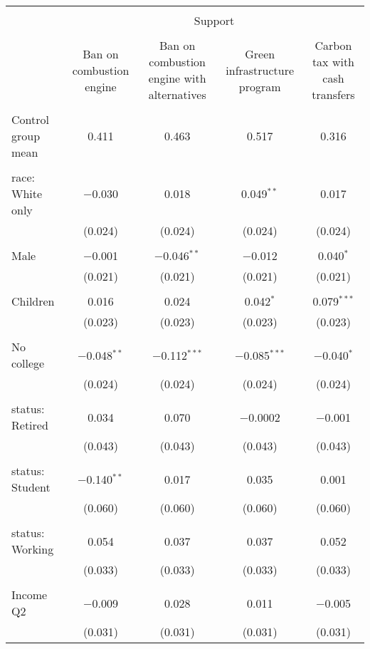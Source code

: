 
\begin{tabular}{@{\extracolsep{5pt}}lcccc} 
\\[-1.8ex]\hline 
\hline \\[-1.8ex] 
 & \multicolumn{4}{c}{Support} \\ 
\cline{2-5} 
\\[-1.8ex] & Ban on combustion engine & Ban on combustion engine with alternatives & Green infrastructure program & Carbon tax with cash transfers \\ 
\hline \\[-1.8ex] 
 Control group mean & 0.411 & 0.463 & 0.517 & 0.316  \\ \hline \\[-1.8ex] race: White only & $-$0.030 & 0.018 & 0.049$^{**}$ & 0.017 \\ 
  & (0.024) & (0.024) & (0.024) & (0.024) \\ 
  & & & & \\ 
 Male & $-$0.001 & $-$0.046$^{**}$ & $-$0.012 & 0.040$^{*}$ \\ 
  & (0.021) & (0.021) & (0.021) & (0.021) \\ 
  & & & & \\ 
 Children & 0.016 & 0.024 & 0.042$^{*}$ & 0.079$^{***}$ \\ 
  & (0.023) & (0.023) & (0.023) & (0.023) \\ 
  & & & & \\ 
 No college & $-$0.048$^{**}$ & $-$0.112$^{***}$ & $-$0.085$^{***}$ & $-$0.040$^{*}$ \\ 
  & (0.024) & (0.024) & (0.024) & (0.024) \\ 
  & & & & \\ 
 status: Retired & 0.034 & 0.070 & $-$0.0002 & $-$0.001 \\ 
  & (0.043) & (0.043) & (0.043) & (0.043) \\ 
  & & & & \\ 
 status: Student & $-$0.140$^{**}$ & 0.017 & 0.035 & 0.001 \\ 
  & (0.060) & (0.060) & (0.060) & (0.060) \\ 
  & & & & \\ 
 status: Working & 0.054 & 0.037 & 0.037 & 0.052 \\ 
  & (0.033) & (0.033) & (0.033) & (0.033) \\ 
  & & & & \\ 
 Income Q2 & $-$0.009 & 0.028 & 0.011 & $-$0.005 \\ 
  & (0.031) & (0.031) & (0.031) & (0.031) \\ 

\end{tabular}
